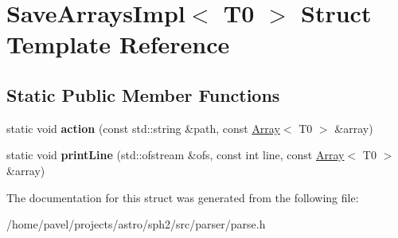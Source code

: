 \hypertarget{structSaveArraysImpl_3_01T0_01_4}{}\section{Save\+Arrays\+Impl$<$ T0 $>$ Struct Template Reference}
\label{structSaveArraysImpl_3_01T0_01_4}
\subsection*{Static Public Member Functions}
\begin{DoxyCompactItemize}
\item 
\hypertarget{structSaveArraysImpl_3_01T0_01_4_a51ef3bbc8d19b5fc936d9a0b6283f48e}{}\label{structSaveArraysImpl_3_01T0_01_4_a51ef3bbc8d19b5fc936d9a0b6283f48e} 
static void {\bfseries action} (const std\+::string \&path, const \hyperlink{classArray}{Array}$<$ T0 $>$ \&array)
\item 
\hypertarget{structSaveArraysImpl_3_01T0_01_4_a35e01343cd65c09ca9301a42c29cdf6f}{}\label{structSaveArraysImpl_3_01T0_01_4_a35e01343cd65c09ca9301a42c29cdf6f} 
static void {\bfseries print\+Line} (std\+::ofstream \&ofs, const int line, const \hyperlink{classArray}{Array}$<$ T0 $>$ \&array)
\end{DoxyCompactItemize}


The documentation for this struct was generated from the following file\+:\begin{DoxyCompactItemize}
\item 
/home/pavel/projects/astro/sph2/src/parser/parse.\+h\end{DoxyCompactItemize}
